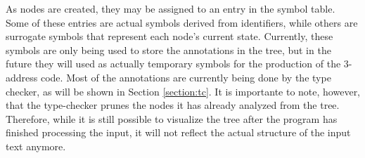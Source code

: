 As nodes are created, they may be assigned to an entry in the symbol table. Some of these entries
are actual symbols derived from identifiers, while others are surrogate symbols that represent
each node's current state. Currently, these symbols are only being used to store the annotations
in the tree, but in the future they will used as actually temporary symbols for the production
of the 3-address code. Most of the annotations are currently being done by the type checker,
as will be shown in Section \ref{section:tc}. It is importante to note, however, that the
type-checker prunes the nodes it has already analyzed from the tree. Therefore, while it is still
possible to visualize the tree after the program has finished processing the input, it will not
reflect the actual structure of the input text anymore.


